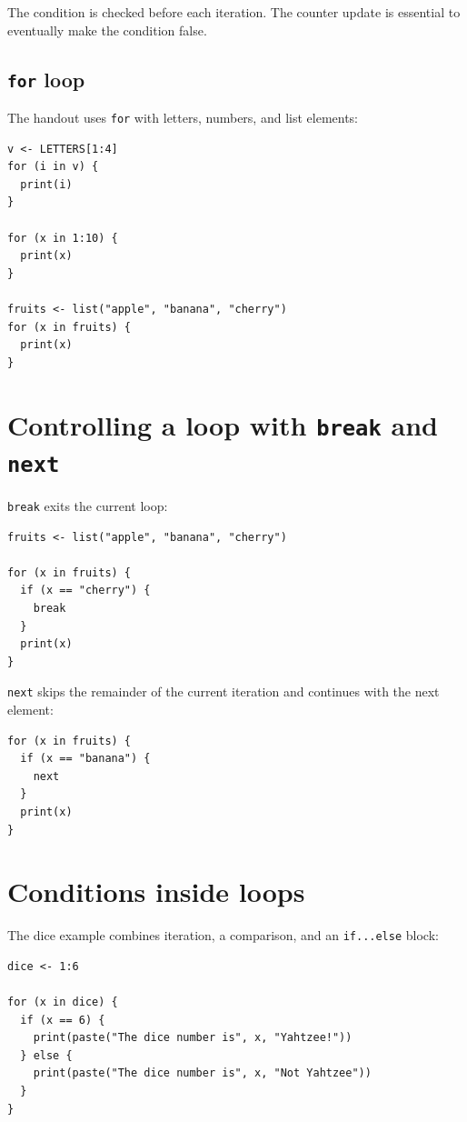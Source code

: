 The condition is checked before each iteration. The counter update is essential to eventually make the condition false.

\subsection{\texttt{for} loop}

The handout uses \texttt{for} with letters, numbers, and list elements:

\begin{lstlisting}[style=dsr]
v <- LETTERS[1:4]
for (i in v) {
  print(i)
}

for (x in 1:10) {
  print(x)
}

fruits <- list("apple", "banana", "cherry")
for (x in fruits) {
  print(x)
}
\end{lstlisting}

\section{Controlling a loop with \texttt{break} and \texttt{next}}

\texttt{break} exits the current loop:

\begin{lstlisting}[style=dsr]
fruits <- list("apple", "banana", "cherry")

for (x in fruits) {
  if (x == "cherry") {
    break
  }
  print(x)
}
\end{lstlisting}

\texttt{next} skips the remainder of the current iteration and continues with the next element:

\begin{lstlisting}[style=dsr]
for (x in fruits) {
  if (x == "banana") {
    next
  }
  print(x)
}
\end{lstlisting}

\section{Conditions inside loops}

The dice example combines iteration, a comparison, and an \texttt{if...else} block:

\begin{lstlisting}[style=dsr]
dice <- 1:6

for (x in dice) {
  if (x == 6) {
    print(paste("The dice number is", x, "Yahtzee!"))
  } else {
    print(paste("The dice number is", x, "Not Yahtzee"))
  }
}
\end{lstlisting}

